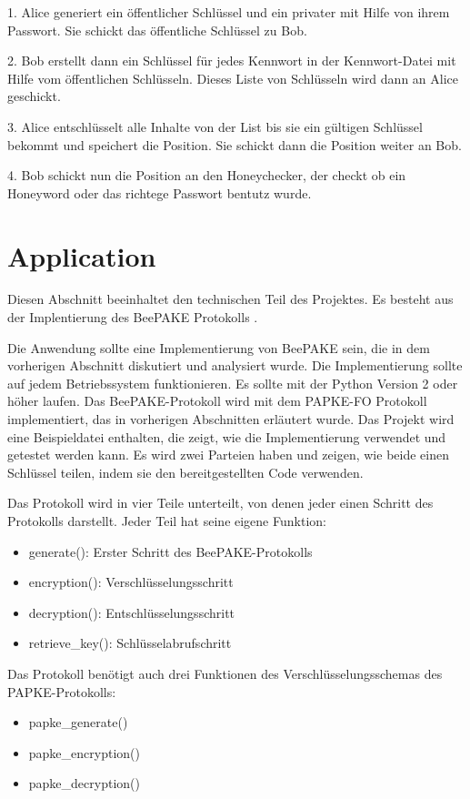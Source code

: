 \documentclass[conference, compsoc]{IEEEtran}
\begin{document}
1. Alice generiert ein öffentlicher Schlüssel und ein privater mit Hilfe von
ihrem Passwort. Sie schickt das öffentliche Schlüssel zu Bob.

2. Bob erstellt dann ein Schlüssel für jedes Kennwort in der Kennwort-Datei
mit Hilfe vom öffentlichen Schlüsseln. Dieses Liste von Schlüsseln wird dann an
Alice geschickt.

3. Alice entschlüsselt alle Inhalte von der List bis sie ein gültigen Schlüssel
bekommt und speichert die Position. Sie schickt dann die Position weiter an Bob.

4. Bob schickt nun die Position an den Honeychecker, der checkt ob ein Honeyword oder
das richtege Passwort bentutz wurde.

\section{Application}
Diesen Abschnitt beeinhaltet den technischen Teil des Projektes. Es besteht aus der 
Implentierung des BeePAKE Protokolls \cite{marjan 2023}.

Die Anwendung sollte eine Implementierung von BeePAKE \cite{marjan2023} sein,
die in dem vorherigen Abschnitt diskutiert und analysiert wurde. Die
Implementierung sollte auf jedem Betriebssystem funktionieren. Es sollte mit
der Python Version 2 oder höher laufen. Das BeePAKE-Protokoll wird mit dem
PAPKE-FO \cite{bradley2019password} Protokoll implementiert, das in vorherigen
Abschnitten erläutert wurde. Das Projekt wird eine Beispieldatei enthalten, die
zeigt, wie die Implementierung verwendet und getestet werden kann. Es wird zwei
Parteien haben und zeigen, wie beide einen Schlüssel teilen, indem sie den
bereitgestellten Code verwenden.

Das Protokoll wird in vier Teile unterteilt, von denen jeder einen Schritt des
Protokolls darstellt. Jeder Teil hat seine eigene Funktion:

\begin{itemize}
	\item generate(): Erster Schritt des BeePAKE-Protokolls
	\item encryption(): Verschlüsselungsschritt
	\item decryption(): Entschlüsselungsschritt
	\item retrieve\_key(): Schlüsselabrufschritt
\end{itemize}

Das Protokoll benötigt auch drei Funktionen des Verschlüsselungsschemas des PAPKE-Protokolls:
\begin{itemize}
	\item papke\_generate()
	\item papke\_encryption()
	\item papke\_decryption()
\end{itemize}
\end{document}
